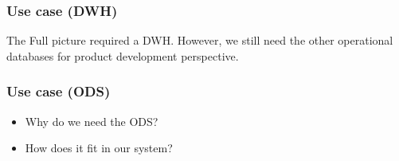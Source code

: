 \begin{frame}
\frametitle{Use case (DWH)}
\centering
The Full picture required a DWH. However, we still need the other operational databases for product development perspective.


\end{frame}

\begin{frame}
\frametitle{Use case (ODS)}
\centering

\begin{itemize}[<+->]
\item Why do we need the ODS?
\item 	How does it fit in our system?
\end{itemize}


\end{frame}



